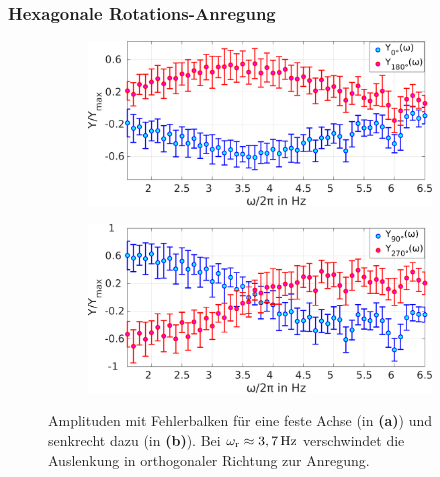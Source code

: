 \documentclass[numbers=noenddot,a4paper,notitlepage,twoside,BCOR15mm]{scrbook}
\newcommand{\ix}[1]{_\text{#1}}
\newcommand{\fett}[1]{\textbf{#1}}
\begin{document}
					\subsubsection*{Hexagonale Rotations-Anregung}

							\begin{figure}[!t]
								\begin{subfigure}{0.49\textwidth}
									\centering
									\includegraphics[width=\textwidth,height=0.6\textwidth]{figs/auswertung/phasen/rotamplitude0180.png}
									\caption{}
								\end{subfigure}
								\begin{subfigure}{0.49\textwidth}
									\centering
									\includegraphics[width=\textwidth,height=0.6\textwidth]{figs/auswertung/phasen/rotamplitude90270.png}
									\caption{}
								\end{subfigure}
								\caption{Amplituden mit Fehlerbalken für eine feste Achse (in \fett{(a)}) und senkrecht dazu (in \fett{(b)}). Bei $\omega\ix{r}\approx\unit[3,7]{Hz}$ verschwindet die Auslenkung in orthogonaler Richtung zur Anregung.}\label{img:hexarotamp}
								\vspace{-0.5cm}
							\end{figure}
\end{document}
